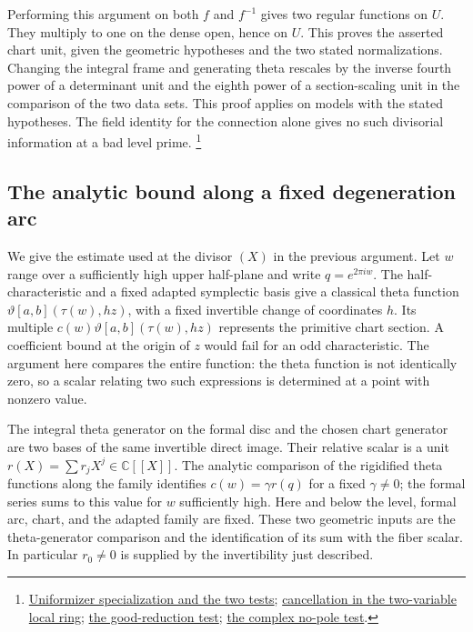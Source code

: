 Performing this argument on both \(f\) and \(f^{-1}\) gives two
regular functions on \(U\). They multiply to one on the dense
open, hence on \(U\). This proves the asserted chart unit, given
the geometric hypotheses and the two stated normalizations.
Changing the integral frame and generating theta rescales by
the inverse fourth power of a determinant unit and the eighth
power of a section-scaling unit in the comparison of the two
data sets. This proof applies on models with the stated
hypotheses. The field identity for the connection alone gives
no such divisorial information at a bad level prime.
\footnote{\href{https://github.com/ChristianKudeba/alpoge-rh-verification/blob/alpoge-source-7cbf7a0c/src/Development/AbelianVarietyTheory/Proofs/DivisorProofs/IntegralOfArcsAndGoodReductionPoints.lean}{Uniformizer specialization and the two tests};
\href{https://github.com/ChristianKudeba/alpoge-rh-verification/blob/alpoge-source-7cbf7a0c/src/Development/AbelianVarietyTheory/Proofs/DivisorProofs/ExistsPowerSeriesOfNoPoleAwayUniformizerX.lean}{cancellation in the two-variable local ring};
\href{https://github.com/ChristianKudeba/alpoge-rh-verification/blob/alpoge-source-7cbf7a0c/src/Development/AbelianVarietyTheory/Proofs/DivisorProofs/IsUnitThetaKeyScalarGoodReductionChart.lean}{the good-reduction test};
\href{https://github.com/ChristianKudeba/alpoge-rh-verification/blob/alpoge-source-7cbf7a0c/src/Development/AbelianVarietyTheory/Proofs/IwasawaDecomposition/NotPoleOfBounded.lean}{the complex no-pole test}.}

\subsection{The analytic bound along a fixed degeneration arc}

We give the estimate used at the divisor \((X)\) in the previous
argument. Let \(w\) range over a sufficiently high upper half-plane
and write \(q=e^{2\pi i w}\). The half-characteristic and a fixed
adapted symplectic basis give a classical theta function
\(\vartheta[a,b](\tau(w),hz)\), with a fixed invertible change
of coordinates \(h\). Its multiple \(c(w)\vartheta[a,b](\tau(w),hz)\)
represents the primitive chart section. A coefficient bound at
the origin of \(z\) would fail for an odd characteristic. The
argument here compares the entire function: the theta function
is not identically zero, so a scalar relating two such expressions
is determined at a point with nonzero value.

The integral theta generator on the formal disc and the chosen
chart generator are two bases of the same invertible direct image.
Their relative scalar is a unit \(r(X)=\sum r_jX^j\in\mathbb C[[X]]\).
The analytic comparison of the rigidified theta functions along
the family identifies \(c(w)=\gamma r(q)\) for a fixed
\(\gamma\ne0\); the formal series sums to this value for \(w\)
sufficiently high. Here and below the level, formal arc, chart,
and the adapted family are fixed. These two geometric inputs are
the theta-generator comparison and the identification of its
sum with the fiber scalar. In particular \(r_0\ne0\) is supplied
by the invertibility just described.

